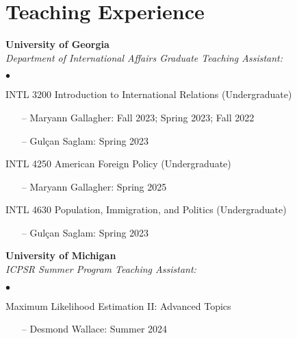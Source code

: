 \documentclass[letterpaper,12pt]{article}
\newenvironment{list2}{
  \begin{list}{$\bullet$}{%
      \setlength{\itemsep}{0in}
      \setlength{\parsep}{0in} 
      \setlength{\parskip}{0in}
      \setlength{\topsep}{0in} 
      \setlength{\partopsep}{0in}
      \setlength{\leftmargin}{1in}
      \setlength{\labelsep}{1em}
      \setlength{\labelwidth}{1em}
      \setlength{\itemindent}{-2em}
      \setlength{\listparindent}{2em}}}{\end{list}}
\begin{document}
\section{Teaching Experience}
\textbf{University of Georgia}\\
\textit{Department of International Affairs Graduate Teaching Assistant:}
\begin{list2}
    \item INTL 3200 Introduction to International Relations (Undergraduate)
        \begin{enumerate}[leftmargin=!,labelindent=0pt,itemindent=-15pt]
            \item[--] Maryann Gallagher: Fall 2023; Spring 2023; Fall 2022
            \item[--] Gulçan Saglam: Spring 2023
        \end{enumerate}
    \item INTL 4250 American Foreign Policy (Undergraduate)
        \begin{enumerate}[leftmargin=!,labelindent=0pt,itemindent=-15pt]
            \item[--] Maryann Gallagher: Spring 2025
        \end{enumerate}
    \item INTL 4630 Population, Immigration, and Politics (Undergraduate)
        \begin{enumerate}[leftmargin=!,labelindent=0pt,itemindent=-15pt]
            \item[--] Gulçan Saglam: Spring 2023
        \end{enumerate}
\end{list2}
\par
\textbf{University of Michigan}\\
\textit{ICPSR Summer Program Teaching Assistant:}
\begin{list2}
    \item Maximum Likelihood Estimation II: Advanced Topics
        \begin{enumerate}[leftmargin=!,labelindent=0pt,itemindent=-15pt]
            \item[--] Desmond Wallace: Summer 2024
        \end{enumerate}
\end{list2}
\end{document}
